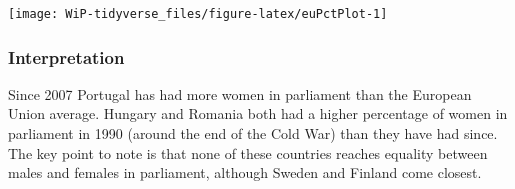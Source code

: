 \documentclass[a4paper,9pt,twocolumn,twoside,printwatermark=false]{pinp}
\begin{document}
\begin{Shaded}
\end{Shaded}

\begin{center}\texttt{[image: WiP-tidyverse\_files/figure-latex/euPctPlot-1]} \end{center}

\hypertarget{interpretation-1}{%
\subsubsection{Interpretation}\label{interpretation-1}}

Since 2007 Portugal has had more women in parliament than the European
Union average. Hungary and Romania both had a higher percentage of women
in parliament in 1990 (around the end of the Cold War) than they have
had since. The key point to note is that none of these countries reaches
equality between males and females in parliament, although Sweden and
Finland come closest.
\end{document}

